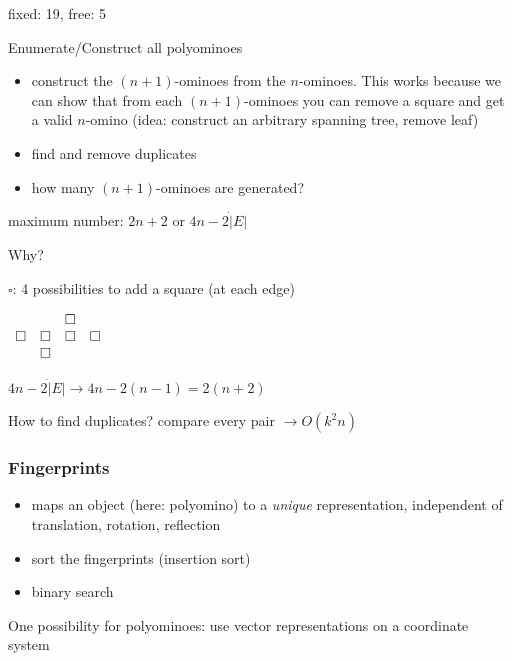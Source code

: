 \documentclass[11pt]{article}
\begin{document}
\begin{itemize}
	fixed: 19, free: 5

\end{itemize}


Enumerate/Construct all polyominoes
\begin{itemize}
\item construct the $ (n + 1) $-ominoes from the $ n $-ominoes. This works because we can show that from each $ (n + 1) $-ominoes you can remove a square and get a valid $ n $-omino (idea: construct an arbitrary spanning tree, remove leaf)
\item find and remove duplicates
\item how many $ (n + 1) $-ominoes are generated?
\end{itemize}

	maximum number:
	$ 2n + 2 $ or $ 4n - 2 \dot | E | $
	
	Why?
	
	$ \square $: 4 possibilities to add a square (at each edge)
	
	$\begin{array}{c c c c}
	& & \square \\
	\square & \square & \square & \square \\
	& \square
	\end{array} $
	
	$ 4n - 2 \dot | E | \rightarrow 4n - 2(n - 1) = 2(n + 2) $
	
	How to find duplicates? compare every pair $ \rightarrow O(k^2 n) $

\subsubsection{Fingerprints}

\begin{itemize}

\item maps an object (here: polyomino) to a \textit{unique} representation, independent of translation, rotation, reflection

\item sort the fingerprints (insertion sort)

\item binary search

\end{itemize}

One possibility for polyominoes: use vector representations on a coordinate system \newline
\end{document}
